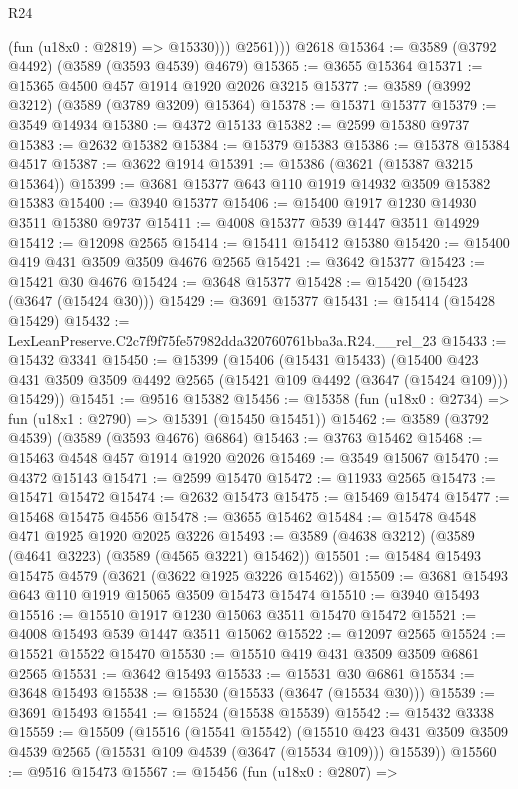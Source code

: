 \begin{lexlean}{R24}
\begin{coremodule}
            (fun (u18x0 : @2819) => @15330)))
          @2561)))
    @2618
@15364 := @3589 (@3792 @4492) (@3589 (@3593 @4539) @4679)
@15365 := @3655 @15364
@15371 := @15365 @4500 @457 @1914 @1920 @2026 @3215
@15377 := @3589 (@3992 @3212) (@3589 (@3789 @3209) @15364)
@15378 := @15371 @15377
@15379 := @3549 @14934
@15380 := @4372 @15133
@15382 := @2599 @15380 @9737
@15383 := @2632 @15382
@15384 := @15379 @15383
@15386 := @15378 @15384 @4517
@15387 := @3622 @1914
@15391 := @15386 (@3621 (@15387 @3215 @15364))
@15399 := @3681 @15377 @643 @110 @1919 @14932 @3509 @15382 @15383
@15400 := @3940 @15377
@15406 := @15400 @1917 @1230 @14930 @3511 @15380 @9737
@15411 := @4008 @15377 @539 @1447 @3511 @14929
@15412 := @12098 @2565
@15414 := @15411 @15412 @15380
@15420 := @15400 @419 @431 @3509 @3509 @4676 @2565
@15421 := @3642 @15377
@15423 := @15421 @30 @4676
@15424 := @3648 @15377
@15428 := @15420 (@15423 (@3647 (@15424 @30)))
@15429 := @3691 @15377
@15431 := @15414 (@15428 @15429)
@15432 := LexLeanPreserve.C2c7f9f75fe57982dda320760761bba3a.R24.__rel_23
@15433 := @15432 @3341
@15450 := @15399
    (@15406
      (@15431 @15433)
      (@15400 @423 @431 @3509 @3509 @4492 @2565 (@15421 @109 @4492 (@3647 (@15424 @109))) @15429))
@15451 := @9516 @15382
@15456 := @15358 (fun (u18x0 : @2734) => fun (u18x1 : @2790) => @15391 (@15450 @15451))
@15462 := @3589 (@3792 @4539) (@3589 (@3593 @4676) @6864)
@15463 := @3763 @15462
@15468 := @15463 @4548 @457 @1914 @1920 @2026
@15469 := @3549 @15067
@15470 := @4372 @15143
@15471 := @2599 @15470
@15472 := @11933 @2565
@15473 := @15471 @15472
@15474 := @2632 @15473
@15475 := @15469 @15474
@15477 := @15468 @15475 @4556
@15478 := @3655 @15462
@15484 := @15478 @4548 @471 @1925 @1920 @2025 @3226
@15493 := @3589 (@4638 @3212) (@3589 (@4641 @3223) (@3589 (@4565 @3221) @15462))
@15501 := @15484 @15493 @15475 @4579 (@3621 (@3622 @1925 @3226 @15462))
@15509 := @3681 @15493 @643 @110 @1919 @15065 @3509 @15473 @15474
@15510 := @3940 @15493
@15516 := @15510 @1917 @1230 @15063 @3511 @15470 @15472
@15521 := @4008 @15493 @539 @1447 @3511 @15062
@15522 := @12097 @2565
@15524 := @15521 @15522 @15470
@15530 := @15510 @419 @431 @3509 @3509 @6861 @2565
@15531 := @3642 @15493
@15533 := @15531 @30 @6861
@15534 := @3648 @15493
@15538 := @15530 (@15533 (@3647 (@15534 @30)))
@15539 := @3691 @15493
@15541 := @15524 (@15538 @15539)
@15542 := @15432 @3338
@15559 := @15509
    (@15516
      (@15541 @15542)
      (@15510 @423 @431 @3509 @3509 @4539 @2565 (@15531 @109 @4539 (@3647 (@15534 @109))) @15539))
@15560 := @9516 @15473
@15567 := @15456
    (fun (u18x0 : @2807) =>

\end{coremodule}
\end{lexlean}
